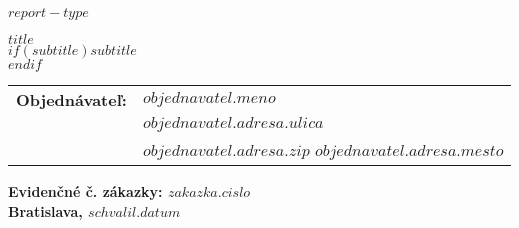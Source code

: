 

\begin{titlepage}

\thispagestyle{titlepage}
\renewcommand{\headrulewidth}{0pt}%

\vspace*{6em}
\begin{center}
  \textrm{\huge\textrm{\bfseries{\uppercase{$report-type$}}}}
\end{center}

\vspace*{2em}
\begin{center}
  {\Large\textsf{\bfseries{$title$}}\\[1\baselineskip]}
  $if(subtitle)${\large\textrm{$subtitle$}}\\[2\baselineskip]$endif$
\end{center}

  \begin{table}[h!] %
\hspace*{2em}
\setlength{\tabcolsep}{6pt} %
\renewcommand{\arraystretch}{1.5} %
\begin{tabular}{ r l }
  \textbf{Objednávateľ:} & \textbf{$objednavatel.meno$} \\
  \multirow{2}{*}{}  & {$objednavatel.adresa.ulica$} \\
                    & {$objednavatel.adresa.zip$ $objednavatel.adresa.mesto$} \\
\end{tabular}
\end{table}

\vspace*{1em}
{\hspace*{2em}\bfseries{Evidenčné č. zákazky: $zakazka.cislo$}}\\[1\baselineskip]
{\hspace*{2em}\textbf{Bratislava, $schvalil.datum$}}\\[1\baselineskip]


\end{titlepage}
